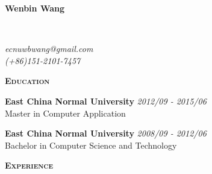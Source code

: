 \documentclass[a4paper]{article}
\newenvironment{changemargin}[2]{%
  \begin{list}{}{%
    \setlength{\topsep}{0pt}%
    \setlength{\leftmargin}{#1}%
    \setlength{\rightmargin}{#2}%
    \setlength{\listparindent}{\parindent}%
    \setlength{\itemindent}{\parindent}%
    \setlength{\parsep}{\parskip}%
  }%
  \item[]}{\end{list}
}
\newcommand{\lineover}{
	\begin{changemargin}{-0.05in}{-0.05in}
		\vspace*{-8pt}
		\hrulefill \\
		\vspace*{-2pt}
	\end{changemargin}
}
\newcommand{\header}[1]{
	\begin{changemargin}{-0.5in}{-0.5in}
		\scshape{\textbf{#1}}\\
	\end{changemargin}
}
\newcommand{\contact}[3]{
	\begin{changemargin}{-0.5in}{-0.5in}
		{\Large \textbf{#1}}\\ \smallskip
		\lineover
		\begin{flushright}
			\emph{#2}\\ \smallskip
			\emph{#3}\smallskip
		\end{flushright}
	\end{changemargin}
}
\newenvironment{body} {
	\vspace*{-16pt}
	\begin{changemargin}{-0.5in}{-0.5in}
  }
	{\end{changemargin}
}
\begin{document}
\contact{Wenbin Wang}{ecnuwbwang@gmail.com}{(+86)151-2101-7457}

\header{Education}

\begin{body}
	\vspace{14pt}

	\textbf{East China Normal University} \hfill \emph{2012/09 - 2015/06}\\
	 Master in Computer Application\\

	\smallskip

	\textbf{East China Normal University} \hfill \emph{2008/09 - 2012/06}\\
	Bachelor in Computer Science and Technology\\
\end{body}

\medskip

\header{Experience}
\end{document}
